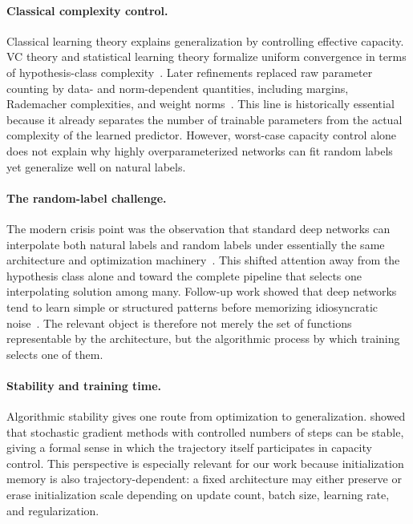 \documentclass{article}
\begin{document}
\paragraph{Classical complexity control.}
Classical learning theory explains generalization by controlling effective capacity.  VC theory and statistical learning theory formalize uniform convergence in terms of hypothesis-class complexity~\citep{vapnik1971uniform,vapnik1998statistical}.  Later refinements replaced raw parameter counting by data- and norm-dependent quantities, including margins, Rademacher complexities, and weight norms~\citep{bartlett1998sample,bartlett2002rademacher,neyshabur2015norm,bartlett2017spectrally}.  This line is historically essential because it already separates the number of trainable parameters from the actual complexity of the learned predictor.  However, worst-case capacity control alone does not explain why highly overparameterized networks can fit random labels yet generalize well on natural labels.

\paragraph{The random-label challenge.}
The modern crisis point was the observation that standard deep networks can interpolate both natural labels and random labels under essentially the same architecture and optimization machinery~\citep{zhang2017understanding,zhang2021understanding}.  This shifted attention away from the hypothesis class alone and toward the complete pipeline that selects one interpolating solution among many.  Follow-up work showed that deep networks tend to learn simple or structured patterns before memorizing idiosyncratic noise~\citep{arpit2017closer,nakkiran2019sgd}.  The relevant object is therefore not merely the set of functions representable by the architecture, but the algorithmic process by which training selects one of them.

\paragraph{Stability and training time.}
Algorithmic stability gives one route from optimization to generalization.  \citep{hardt2016train} showed that stochastic gradient methods with controlled numbers of steps can be stable, giving a formal sense in which the trajectory itself participates in capacity control.  This perspective is especially relevant for our work because initialization memory is also trajectory-dependent: a fixed architecture may either preserve or erase initialization scale depending on update count, batch size, learning rate, and regularization.
\end{document}
